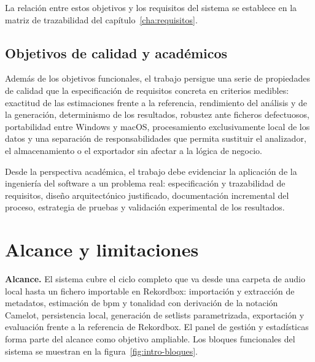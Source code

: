 La relación entre estos objetivos y los requisitos del sistema se establece en la matriz de trazabilidad del capítulo~\ref{cha:requisitos}.

\subsection{Objetivos de calidad y académicos}

Además de los objetivos funcionales, el trabajo persigue una serie de propiedades de calidad que la especificación de requisitos concreta en criterios medibles: exactitud de las estimaciones frente a la referencia, rendimiento del análisis y de la generación, determinismo de los resultados, robustez ante ficheros defectuosos, portabilidad entre Windows y macOS, procesamiento exclusivamente local de los datos y una separación de responsabilidades que permita sustituir el analizador, el almacenamiento o el exportador sin afectar a la lógica de negocio.

Desde la perspectiva académica, el trabajo debe evidenciar la aplicación de la ingeniería del software a un problema real: especificación y trazabilidad de requisitos, diseño arquitectónico justificado, documentación incremental del proceso, estrategia de pruebas y validación experimental de los resultados.

\section{Alcance y limitaciones}
\label{sec:intro-alcance}

\medskip\noindent\textbf{Alcance.} El sistema cubre el ciclo completo que va desde una carpeta de audio local hasta un fichero importable en Rekordbox: importación y extracción de metadatos, estimación de \acs{bpm} y tonalidad con derivación de la notación Camelot, persistencia local, generación de setlists parametrizada, exportación y evaluación frente a la referencia de Rekordbox. El panel de gestión y estadísticas forma parte del alcance como objetivo ampliable. Los bloques funcionales del sistema se muestran en la figura~\ref{fig:intro-bloques}.

